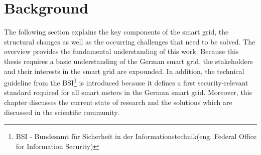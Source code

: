 \chapter{Background}
\label{sec:state}







The following section explains the key components of the smart grid, the structural changes as well as the occurring challenges that need to be solved. The overview provides the fundamental understanding of this work. Because this thesis requires a basic understanding of the German smart grid, the stakeholders and their interests in the smart grid are expounded. In addition, the technical guideline from the \gls{BSI}\footnote[1]{BSI - Bundesamt für Sicherheit in der Informationstechnik(eng. Federal Office for Information Security)} is introduced because it defines a first security-relevant standard required for all smart meters in the German smart grid. Moreover, this chapter discusses the current state of research and the solutions which are discussed in the scientific community.\\

